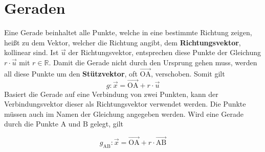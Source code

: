 \documentclass{article}
\begin{document}
 
\newcommand{\vect}[1]{\overrightarrow{#1}} 
  
\section{Geraden}
\begin{minipage}{\dimexpr\textwidth-6cm}
Eine Gerade beinhaltet alle Punkte, welche in eine bestimmte Richtung zeigen, heißt zu dem Vektor, welcher die Richtung angibt, dem \textbf{Richtungsvektor}, kollinear sind. Ist $\vect{u}$ der Richtungsvektor, entsprechen diese Punkte der Gleichung $r \cdot \vect{u}$ mit $r \in \mathbb{R}$. Damit die Gerade nicht durch den Ursprung gehen muss, werden all diese Punkte um den \textbf{Stützvektor}, oft $\vect{\mathrm{OA}}$, verschoben.
Somit gilt 
\[
 g: \vect{x} = \vect{\mathrm{OA}} + r \cdot \vect{u} 
\] 
Basiert die Gerade auf eine Verbindung von zwei Punkten, kann der Verbindungsvektor dieser als Richtungsvektor verwendet werden. Die Punkte müssen auch im Namen der Gleichung angegeben werden. Wird eine Gerade durch die Punkte $\mathrm{A}$ und $\mathrm{B}$ gelegt, gilt
\end{minipage} 
\hfill
\begin{minipage}{6cm}
  \centering
\end{minipage}
 
\vspace{1em} 
\[
 g_{\mathrm{AB}}: \vect{x} = \vect{\mathrm{OA}} + r \cdot \vect{\mathrm{AB}} 
\]
 
\end{document}
